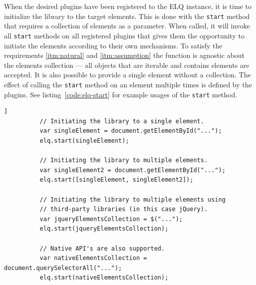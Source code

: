 \documentclass[a4paper,11pt]{kth-mag}
\newcommand{\code}[1]{\texttt{#1}}
\begin{document}
        When the desired plugins have been registered to the \gls{ELQ} instance, it is time to initialize the library to the target \glspl{element}.
        This is done with the \code{start} method that requires a collection of \glspl{element} as a parameter.
        When called, it will invoke all \code{start} methods on all registered plugins that gives them the opportunity to initiate the \glspl{element} according to their own mechanisms.
        To satisfy the requirements \ref{itm:natural} and \ref{itm:assumption} the function is agnostic about the \glspl{element} collection --- all objects that are iterable and contains \glspl{element} are accepted.
        It is also possible to provide a single \gls{element} without a collection.
        The effect of calling the \code{start} method on an element multiple times is defined by the plugins.
        See listing~\ref{code:elq-start} for example usages of the \code{start} method.
        \begin{lstlisting}[gobble=10,caption={Example usages of the \code{start} method. The method only requires an iterable collection, so it is library agnostic.},captionpos=b,label={code:elq-start}]]
          // Initiating the library to a single element.
          var singleElement = document.getElementById("...");
          elq.start(singleElement);

          // Initiating the library to multiple elements.
          var singleElement2 = document.getElementById("...");
          elq.start([singleElement, singleElement2]);

          // Initiating the library to multiple elements using
          // third-party libraries (in this case jQuery).
          var jqueryElementsCollection = $("...");
          elq.start(jqueryElementsCollection);

          // Native API's are also supported.
          var nativeElementsCollection = document.querySelectorAll("...");
          elq.start(nativeElementsCollection);
        \end{lstlisting}

\end{document}
